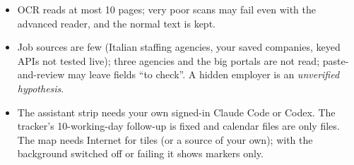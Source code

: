 \begin{itemize}
        CLI's own knowledge and can be missing, partly verified or wrong; the idle analysis works only when the PC is idle,
        within its daily request budget (chapter~\ref{ch:interest}).
  \item OCR reads at most 10 pages; very poor scans may fail even with the advanced reader, and the normal text is kept.
  \item Job sources are few (Italian staffing agencies, your saved companies, keyed APIs not tested live); three agencies
        and the big portals are not read; paste-and-review may leave fields ``to check''. A hidden employer is an
        \emph{unverified hypothesis}.
  \item The assistant strip needs your own signed-in Claude Code or Codex. The tracker's 10-working-day follow-up is
        fixed and calendar files are only files. The map needs Internet for tiles (or a source of your own); with the background switched off or failing it
        shows markers only.
\end{itemize}

